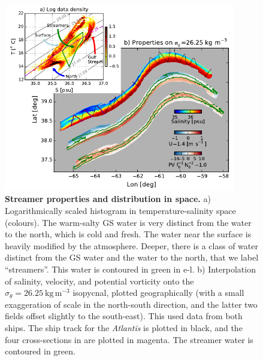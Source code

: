 \documentclass{natureJMK}
\begin{document}
\begin{figure}[htbp]
  \centering
    \includegraphics[width=0.9\textwidth]{./ComposeTSfigNew.pdf}
  \caption{{\bf Streamer properties and distribution in space.}
a) Logarithmically scaled histogram
 in temperature-salinity space (colours). The warm-salty GS water is very distinct from the water to the north, which is cold and fresh.  The water near the surface is heavily modified by the atmosphere.  Deeper, there is a class of water distinct from the GS water and the water to the north, that we label ``streamers''.  This water is contoured in green in e-l.  b) Interpolation of salinity, velocity, and potential vorticity onto the $\sigma_{\theta}=26.25\ \mathrm{kg\,m^{-3}}$ isopycnal, plotted geographically (with a small exaggeration of scale in the north-south direction, and the latter two fields offset slightly to the south-east). This used data from both ships.  The ship track for the \emph{Atlantis} is plotted in black, and the four cross-sections in  are plotted in magenta.  The streamer water is contoured in green.  
  } \label{fig:ComposeTSfigNew}
\end{figure}
\end{document}
